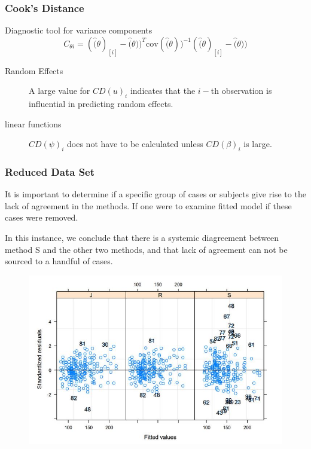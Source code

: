 \documentclass[12pt, a4paper]{report}
\theoremstyle{plain}
\theoremstyle{definition}
\theoremstyle{remark}
\begin{document}
	
	

	
	
	
	
	
\subsubsection{Cook's Distance}

Diagnostic tool for variance components
\[ C_{\theta i} =(\hat(\theta)_{[i]} - \hat(\theta))^{T}\mbox{cov}( \hat(\theta))^{-1}(\hat(\theta)_{[i]} - \hat(\theta))\]

\begin{description}
	\item[Random Effects]	
	A large value for $CD(u)_i$ indicates that the $i-$th observation is influential in predicting random effects.
	\item[linear functions]
	$CD(\psi)_i$ does not have to be calculated unless $CD(\beta)_i$ is large.
\end{description}






	\subsubsection{Reduced Data Set}
	It is important to determine if a specific group of cases or subjects give rise to the lack of agreement in the methods. If one were to examine fitted model if these cases were removed.
	
	
	In this instance, we conclude that there is a systemic diagreement between method S and the other two methods, and that lack of agreement can not be sourced to a handful of cases.
	\begin{figure}[h!]
		\centering
		\includegraphics[width=0.7\linewidth]{images/bloodnlmeResidPlot2B}
	\end{figure}
	
\end{document}
